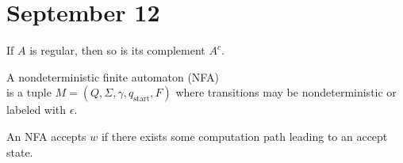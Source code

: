 \section{September 12}

\begin{theorem}
If $A$ is regular, then so is its complement $A^c$.
\end{theorem}

\begin{definition}
A nondeterministic finite automaton (NFA)
\\
 is a tuple $M = (Q, \Sigma, \gamma, q_{\text{start}}, F)$ where transitions may be nondeterministic or labeled with $\epsilon$.
\end{definition}

An NFA accepts $w$ if there exists some computation path leading to an accept state.
